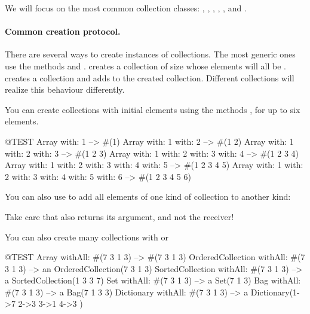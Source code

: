 \documentclass[a4paper,10pt,twoside]{book}
\begin{document}
We will focus on the most common collection classes: , , , , , and .

\paragraph{Common creation protocol.}
There are several ways to create instances of collections. The most generic ones use the methods  and .  creates a collection of size  whose elements will all be .    creates a collection and adds  to the created collection. Different collections will realize this behaviour differently.

You can create collections with initial elements using the methods ,  \etc for up to six elements.

\begin{code}{@TEST}
Array with: 1 --> #(1)
Array with: 1 with: 2 --> #(1 2)
Array with: 1 with: 2 with: 3 --> #(1 2 3)
Array with: 1 with: 2 with: 3 with: 4 --> #(1 2 3 4)
Array with: 1 with: 2 with: 3 with: 4 with: 5 --> #(1 2 3 4 5)
Array with: 1 with: 2 with: 3 with: 4 with: 5 with: 6 --> #(1 2 3 4 5 6)
\end{code}

You can also use  to add all elements of one kind of collection to another kind:

\noindent
Take care that  also returns its argument, and not the receiver!

You can also create many collections with  or 

\begin{code}{@TEST}
Array withAll: #(7 3 1 3)                      --> #(7 3 1 3)
OrderedCollection withAll: #(7 3 1 3) --> an OrderedCollection(7 3 1 3)
SortedCollection withAll: #(7 3 1 3)    --> a SortedCollection(1 3 3 7)
Set withAll: #(7 3 1 3)                         --> a Set(7 1 3)
Bag withAll: #(7 3 1 3)                        --> a Bag(7 1 3 3)
Dictionary withAll: #(7 3 1 3)               --> a Dictionary(1->7 2->3 3->1 4->3 )
\end{code}
\end{document}
